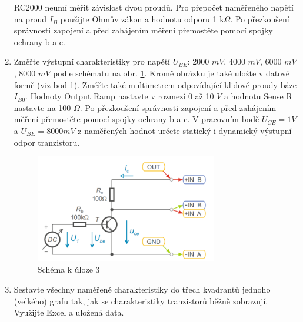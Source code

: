 \documentclass[a4paper]{article}
\begin{document}
\begin{enumerate}
	RC2000 neumí měřit závislost dvou proudů. Pro přepočet naměřeného napětí na proud $I_B$ použijte
	Ohmův zákon a hodnotu odporu 1 k$\Omega$.
	Po přezkoušení správnosti zapojení a před zahájením měření přemostěte pomocí spojky ochrany
	b a c.
	\item Změřte výstupní charakteristiky pro napětí $U_{BE}$: 2000 $mV$, 4000 $mV$, 6000 $mV$, 8000 $mV$
	podle schématu na obr. \ref{fig:mesh2}.
	Kromě obrázku je také uložte v datové formě (viz bod 1). Změřte také multimetrem odpovídající
	klidové proudy báze $I_{B0}$.
	Hodnoty Output Ramp nastavte v rozmezí 0 až 10 $V$ a hodnotu Sense R nastavte na 100 $\Omega$.
	Po přezkoušení správnosti zapojení a před zahájením měření přemostěte pomocí spojky ochrany
	b a c.
	V pracovním bodě $U_{CE} = 1 V$ a $U_{BE} = 8000 mV$ z naměřených hodnot určete statický i dynamický
	výstupní odpor tranzistoru.
	\begin{figure}[H]
		\centering
		\includegraphics[width=0.75\textwidth]{schema2.png}
		\caption{Schéma k úloze 3}
		\label{fig:mesh2}
	\end{figure}
	\item Sestavte všechny naměřené charakteristiky do třech kvadrantů jednoho (velkého) grafu tak, jak
	se charakteristiky tranzistorů běžně zobrazují. Využijte Excel a uložená data.
\end{enumerate}
\end{document}
